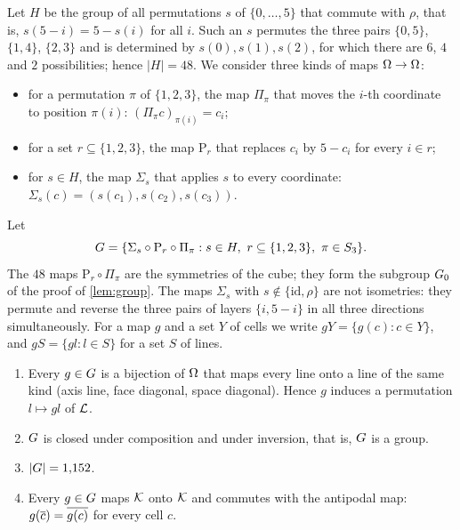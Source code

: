 Let $H$ be the group of all permutations $s$ of $\{0,\dots,5\}$ that commute with $\rho$, that is,
$s(5-i)=5-s(i)$ for all $i$. Such an $s$ permutes the three pairs $\{0,5\}$, $\{1,4\}$, $\{2,3\}$ and is
determined by $s(0),s(1),s(2)$, for which there are $6$, $4$ and $2$ possibilities; hence $|H|=48$. We
consider three kinds of maps $\Omega\to\Omega$:
\begin{itemize}
\item for a permutation $\pi$ of $\{1,2,3\}$, the map $\Pi_\pi$ that moves the $i$-th coordinate to
      position $\pi(i)$: $(\Pi_\pi c)_{\pi(i)}=c_i$;
\item for a set $r\subseteq\{1,2,3\}$, the map $\mathrm{P}_r$ that replaces $c_i$ by $5-c_i$ for every
      $i\in r$;
\item for $s\in H$, the map $\Sigma_s$ that applies $s$ to every coordinate:
      $\Sigma_s(c)=(s(c_1),s(c_2),s(c_3))$.
\end{itemize}
Let
\[
  G=\{\Sigma_s\circ\mathrm{P}_r\circ\Pi_\pi : s\in H,\ r\subseteq\{1,2,3\},\ \pi\in S_3\}.
\]
The $48$ maps $\mathrm{P}_r\circ\Pi_\pi$ are the symmetries of the cube; they form the subgroup $G_0$ of
the proof of \cref{lem:group}. The maps $\Sigma_s$ with
$s\notin\{\mathrm{id},\rho\}$ are not isometries: they permute and reverse the three pairs of layers
$\{i,5-i\}$ in all three directions simultaneously. For a map $g$ and a set $Y$ of cells we write
$gY=\{g(c):c\in Y\}$, and $gS=\{gl : l\in S\}$ for a set $S$ of lines.

\begin{lemma}\label{lem:group}
\begin{enumerate}[label=\textup{(\alph*)}]
\item Every $g\in G$ is a bijection of $\Omega$ that maps every line onto a line of the same kind (axis line,
      face diagonal, space diagonal). Hence $g$ induces a permutation $l\mapsto gl$ of $\mathcal{L}$.
\item $G$ is closed under composition and under inversion, that is, $G$ is a group.
\item $|G|=1{,}152$.
\item Every $g\in G$ maps $\mathcal{K}$ onto $\mathcal{K}$ and commutes with the antipodal map:
      $g(\overline{c})=\overline{g(c)}$ for every cell $c$.
\end{enumerate}
\end{lemma}

